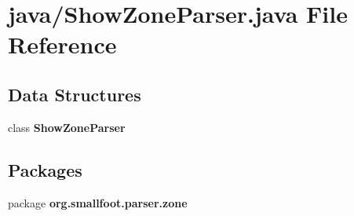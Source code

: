 \section{java/\+Show\+Zone\+Parser.java File Reference}
\label{ShowZoneParser_8java}
\subsection*{Data Structures}
\begin{DoxyCompactItemize}
\item 
class {\bf Show\+Zone\+Parser}
\end{DoxyCompactItemize}
\subsection*{Packages}
\begin{DoxyCompactItemize}
\item 
package {\bf org.\+smallfoot.\+parser.\+zone}
\end{DoxyCompactItemize}
